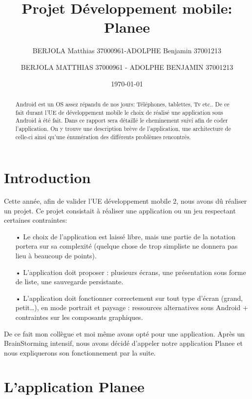 \documentclass[12pt,a4paper]{report}
\author{BERJOLA Matthias 37000961-ADOLPHE Benjamin 37001213}           %
\begin{document}
\title{Projet Développement mobile: Planee}
\author{BERJOLA MATTHIAS 37000961 - ADOLPHE BENJAMIN 37001213}
\date{\today} 

\maketitle


\newpage

\tableofcontents
\newpage
\begin{abstract}
\begin{flushleft}
\justify
Android est un OS assez répandu de nos jours: Téléphones, tablettes, Tv etc.. De ce fait durant l'UE de développement mobile le choix de réalisé une application sous Android à été fait. Dans ce rapport sera détaillé le cheminement suivi  afin de coder l'application. On y trouve une description brève de l'application, une  architecture de celle-ci ainsi qu'une énumération des différents problèmes rencontrés.
\end{flushleft}
\end{abstract}
\chapter*{Introduction}  
\begin{flushleft}
\justify
Cette année, afin de valider l'UE développement mobile 2, nous avons dû réaliser un projet. Ce projet consistait à réaliser une application ou un jeu respectant certaines contraintes:
\begin{itemize}
\item[•] Le choix de l'application est laissé libre, mais une partie de la notation portera sur sa complexité (quelque chose de trop simpliste ne donnera pas lieu à beaucoup de points).
\item[•] L’application doit proposer : plusieurs écrans, une présentation
sous forme de liste, une sauvegarde persistante.
\item[•] L’application doit fonctionner correctement sur tout type d’écran (grand, petit…), en mode portrait et paysage : ressources alternatives sous Android + contraintes sur les composants graphiques.
\end{itemize}
De ce fait mon collègue et moi même avons opté pour une application. Après un BrainStorming intensif, nous avons décidé d'appeler notre application Planee et nous expliquerons son fonctionnement par la suite.
\end{flushleft}

\newpage
\chapter*{L'application Planee}
\end{document}

